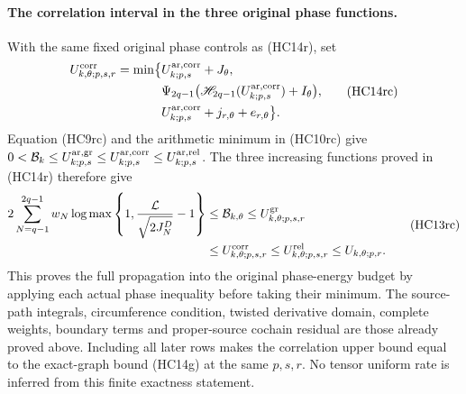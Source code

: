 \paragraph{The correlation interval in the three original phase functions.}
With the same fixed original phase controls as (HC14r), set
\[
\begin{aligned}
 U_{k,\theta;p,s,r}^{\rm corr}
 =\min\bigl\{&U_{k;p,s}^{\rm ar,corr}+J_\theta,\\
 &\Psi_{2q-1}\bigl(\mathscr H_{2q-1}
          (U_{k;p,s}^{\rm ar,corr})+I_\theta\bigr),\\
 &U_{k;p,s}^{\rm ar,corr}+j_{r,\theta}+e_{r,\theta}\bigr\}.
\end{aligned}\tag{HC14rc}
\]
Equation (HC9rc) and the arithmetic minimum in (HC10rc) give
$0<\mathcal B_k\leq U_{k;p,s}^{\rm ar,gr}
\leq U_{k;p,s}^{\rm ar,corr}\leq U_{k;p,s}^{\rm ar,rel}$.
The three increasing functions proved in (HC14r) therefore give
\[
\begin{aligned}
 2\sum_{N=q-1}^{2q-1}w_N
 \log\max\left\{1,\frac{\mathcal L}{\sqrt{2J_N^D}}-1\right\}
 &\leq\mathcal B_{k,\theta}\leq U_{k,\theta;p,s,r}^{\rm gr}\\
 &\leq U_{k,\theta;p,s,r}^{\rm corr}
 \leq U_{k,\theta;p,s,r}^{\rm rel}\leq U_{k,\theta;p,r}.
\end{aligned}\tag{HC13rc}
\]
This proves the full propagation into the original phase-energy
budget by applying each actual phase inequality before taking
their minimum. The source-path integrals, circumference condition,
twisted derivative domain, complete weights, boundary terms and
proper-source cochain residual are those already proved above.
Including all later rows makes the correlation upper bound equal
to the exact-graph bound (HC14g) at the same $p,s,r$. No tensor
uniform rate is inferred from this finite exactness statement.

